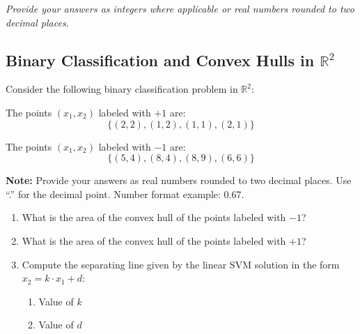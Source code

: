 \documentclass{article}
\begin{document}
\textit{Provide your answers as integers where applicable or real numbers rounded to two decimal places.}


\subsection*{Binary Classification and Convex Hulls in \(\mathbb{R}^2\)}

Consider the following binary classification problem in \(\mathbb{R}^2\):

The points \((x_1, x_2)\) labeled with \(+1\) are:
\[
\{(2, 2), (1, 2), (1, 1), (2, 1)\}
\]

The points \((x_1, x_2)\) labeled with \(-1\) are:
\[
\{(5, 4), (8, 4), (8, 9), (6, 6)\}
\]

\textbf{Note:} Provide your answers as real numbers rounded to two decimal places. Use ``.'' for the decimal point. Number format example: 0.67.

\begin{enumerate}
    \item What is the area of the convex hull of the points labeled with \(-1\)?
    \item What is the area of the convex hull of the points labeled with \(+1\)?
    \item Compute the separating line given by the linear SVM solution in the form \(x_2 = k \cdot x_1 + d\):
    \begin{enumerate}
        \item Value of \(k\)
        \item Value of \(d\)
    \end{enumerate}
\end{enumerate}
\end{document}
